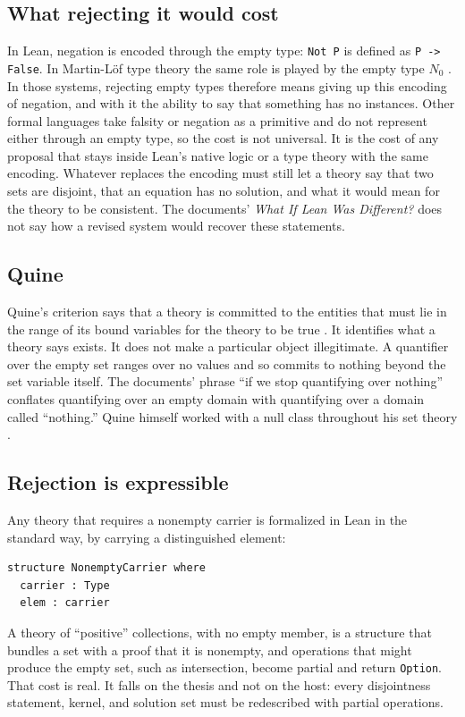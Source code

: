 \documentclass[11pt]{article}
\begin{document}
\subsection{What rejecting it would cost}

In Lean, negation is encoded through the empty type: \texttt{Not P} is defined as \texttt{P -> False}. In Martin-L\"of type theory the same role is played by the empty type $N_0$ \cite{martinlof1984}. In those systems, rejecting empty types therefore means giving up this encoding of negation, and with it the ability to say that something has no instances. Other formal languages take falsity or negation as a primitive and do not represent either through an empty type, so the cost is not universal. It is the cost of any proposal that stays inside Lean's native logic or a type theory with the same encoding. Whatever replaces the encoding must still let a theory say that two sets are disjoint, that an equation has no solution, and what it would mean for the theory to be consistent. The documents' \emph{What If Lean Was Different?} does not say how a revised system would recover these statements.

\subsection{Quine}

Quine's criterion says that a theory is committed to the entities that must lie in the range of its bound variables for the theory to be true \cite{quine1948}. It identifies what a theory says exists. It does not make a particular object illegitimate. A quantifier over the empty set ranges over no values and so commits to nothing beyond the set variable itself. The documents' phrase ``if we stop quantifying over nothing'' conflates quantifying over an empty domain with quantifying over a domain called ``nothing.'' Quine himself worked with a null class throughout his set theory \cite{quine1963}.

\subsection{Rejection is expressible}

Any theory that requires a nonempty carrier is formalized in Lean in the standard way, by carrying a distinguished element:
\begin{lstlisting}
structure NonemptyCarrier where
  carrier : Type
  elem : carrier
\end{lstlisting}
A theory of ``positive'' collections, with no empty member, is a structure that bundles a set with a proof that it is nonempty, and operations that might produce the empty set, such as intersection, become partial and return \texttt{Option}. That cost is real. It falls on the thesis and not on the host: every disjointness statement, kernel, and solution set must be redescribed with partial operations.
\end{document}
